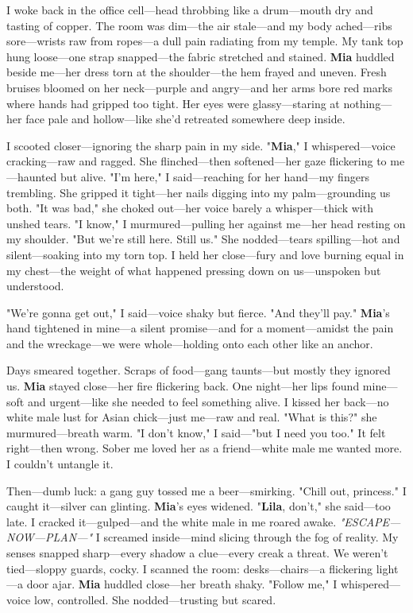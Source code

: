 \documentclass{article}
\begin{document}
I woke back in the office cell—head throbbing like a drum—mouth dry and tasting of copper. The room was dim—the air stale—and my body ached—ribs sore—wrists raw from ropes—a dull pain radiating from my temple. My tank top hung loose—one strap snapped—the fabric stretched and stained. \textbf{Mia} huddled beside me—her dress torn at the shoulder—the hem frayed and uneven. Fresh bruises bloomed on her neck—purple and angry—and her arms bore red marks where hands had gripped too tight. Her eyes were glassy—staring at nothing—her face pale and hollow—like she’d retreated somewhere deep inside.

I scooted closer—ignoring the sharp pain in my side. "\textbf{Mia}," I whispered—voice cracking—raw and ragged. She flinched—then softened—her gaze flickering to me—haunted but alive. "I’m here," I said—reaching for her hand—my fingers trembling. She gripped it tight—her nails digging into my palm—grounding us both. "It was bad," she choked out—her voice barely a whisper—thick with unshed tears. "I know," I murmured—pulling her against me—her head resting on my shoulder. "But we’re still here. Still us." She nodded—tears spilling—hot and silent—soaking into my torn top. I held her close—fury and love burning equal in my chest—the weight of what happened pressing down on us—unspoken but understood.

"We’re gonna get out," I said—voice shaky but fierce. "And they’ll pay." \textbf{Mia}’s hand tightened in mine—a silent promise—and for a moment—amidst the pain and the wreckage—we were whole—holding onto each other like an anchor.

Days smeared together. Scraps of food—gang taunts—but mostly they ignored us. \textbf{Mia} stayed close—her fire flickering back. One night—her lips found mine—soft and urgent—like she needed to feel something alive. I kissed her back—no white male lust for Asian chick—just me—raw and real. "What is this?" she murmured—breath warm. "I don’t know," I said—"but I need you too." It felt right—then wrong. Sober me loved her as a friend—white male me wanted more. I couldn’t untangle it.

Then—dumb luck: a gang guy tossed me a beer—smirking. "Chill out, princess." I caught it—silver can glinting. \textbf{Mia}’s eyes widened. "\textbf{Lila}, don’t," she said—too late. I cracked it—gulped—and the white male in me roared awake. \textit{"ESCAPE—NOW—PLAN—"} I screamed inside—mind slicing through the fog of reality. My senses snapped sharp—every shadow a clue—every creak a threat. We weren’t tied—sloppy guards, cocky. I scanned the room: desks—chairs—a flickering light—a door ajar. \textbf{Mia} huddled close—her breath shaky. "Follow me," I whispered—voice low, controlled. She nodded—trusting but scared.
\end{document}
